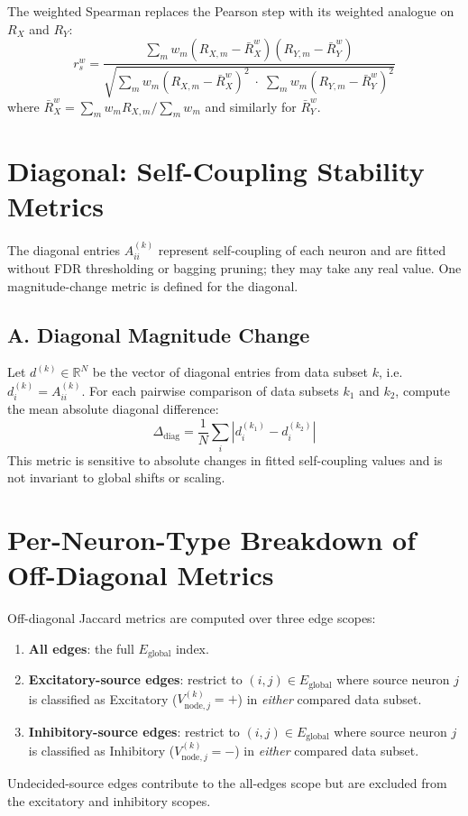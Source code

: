 \documentclass[11pt]{article}
\begin{document}
The weighted Spearman replaces the Pearson step with its weighted analogue on $R_X$ and $R_Y$:
\[
r_s^w = \frac{\sum_m w_m (R_{X,m} - \bar{R}_X^w)(R_{Y,m} - \bar{R}_Y^w)}
             {\sqrt{\sum_m w_m (R_{X,m} - \bar{R}_X^w)^2 \;\cdot\; \sum_m w_m (R_{Y,m} - \bar{R}_Y^w)^2}}
\]
where $\bar{R}_X^w = \sum_m w_m R_{X,m} / \sum_m w_m$ and similarly for $\bar{R}_Y^w$.

\section{Diagonal: Self-Coupling Stability Metrics}
\label{sec:diagonal}

The diagonal entries $A^{(k)}_{ii}$ represent self-coupling of each neuron and are fitted without FDR thresholding or bagging pruning; they may take any real value. One magnitude-change metric is defined for the diagonal.

\subsection*{A. Diagonal Magnitude Change}

Let $d^{(k)} \in \mathbb{R}^N$ be the vector of diagonal entries from data subset $k$, i.e.\ $d^{(k)}_i = A^{(k)}_{ii}$. For each pairwise comparison of data subsets $k_1$ and $k_2$, compute the mean absolute diagonal difference:
\[
\Delta_{\text{diag}} = \frac{1}{N}\sum_i \left|d^{(k_1)}_i - d^{(k_2)}_i\right|
\]
This metric is sensitive to absolute changes in fitted self-coupling values and is not invariant to global shifts or scaling.

\section{Per-Neuron-Type Breakdown of Off-Diagonal Metrics}
\label{sec:neurontype}

Off-diagonal Jaccard metrics are computed over three edge scopes:
\begin{enumerate}
    \item \textbf{All edges}: the full $E_{\text{global}}$ index.
    \item \textbf{Excitatory-source edges}: restrict to $(i,j) \in E_{\text{global}}$ where source neuron $j$ is classified as Excitatory ($V^{(k)}_{\text{node},j} = +$) in \emph{either} compared data subset.
    \item \textbf{Inhibitory-source edges}: restrict to $(i,j) \in E_{\text{global}}$ where source neuron $j$ is classified as Inhibitory ($V^{(k)}_{\text{node},j} = -$) in \emph{either} compared data subset.
\end{enumerate}
Undecided-source edges contribute to the all-edges scope but are excluded from the excitatory and inhibitory scopes.
\end{document}
